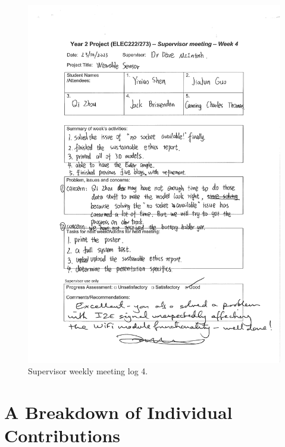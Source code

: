 \documentclass[12pt, a4paper]{report}
\begin{document}
\begin{figure}[htbp]
	\centering
	\includegraphics[width=\textwidth]{
		appendix/meeting-log-4}
	\caption{Supervisor weekly meeting log 4.}
	\label{fig:meeting-log-4}
\end{figure}



\chapter{A Breakdown of Individual Contributions}
\end{document}
